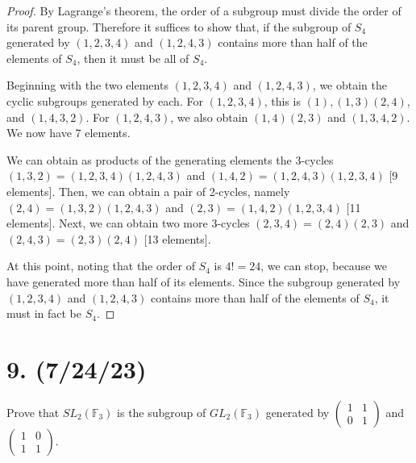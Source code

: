 \documentclass{article}
\begin{document}
\begin{proof}
    By Lagrange's theorem, the order of a subgroup must divide the order of its parent group. Therefore it suffices to show that, if the subgroup of $S_4$ generated by $(1, 2, 3, 4)$ and $(1, 2, 4, 3)$ contains more than half of the elements of $S_4$, then it must be all of $S_4$.

    Beginning with the two elements $(1, 2, 3, 4)$ and $(1, 2, 4, 3)$, we obtain the cyclic subgroups generated by each. For $(1, 2, 3, 4)$, this is $(1), (1, 3)(2, 4)$, and $(1, 4, 3, 2)$. For $(1, 2, 4, 3)$, we also obtain $(1, 4)(2, 3)$ and $(1, 3, 4, 2)$. We now have 7 elements.

    We can obtain as products of the generating elements the 3-cycles $(1, 3, 2) = (1, 2, 3, 4)(1, 2, 4, 3)$ and $(1, 4, 2) = (1, 2, 4, 3)(1, 2, 3, 4)$ [9 elements]. Then, we can obtain a pair of 2-cycles, namely $(2, 4) = (1, 3, 2)(1, 2, 4, 3)$ and $(2, 3) = (1, 4, 2)(1, 2, 3, 4)$ [11 elements]. Next, we can obtain two more 3-cycles $(2, 3, 4) = (2, 4)(2, 3)$ and $(2, 4, 3) = (2, 3)(2, 4)$ [13 elements].

    At this point, noting that the order of $S_4$ is $4! = 24$, we can stop, because we have generated more than half of its elements. Since the subgroup generated by $(1, 2, 3, 4)$ and $(1, 2, 4, 3)$ contains more than half of the elements of $S_4$, it must in fact be $S_4$.
\end{proof}

\section*{9. (7/24/23)}

Prove that $SL_2(\mathbb{F}_3)$ is the subgroup of $GL_2(\mathbb{F}_3)$ generated by $\begin{pmatrix}1 & 1 \\ 0 & 1\end{pmatrix}$ and $\begin{pmatrix}1 & 0 \\ 1 & 1\end{pmatrix}$.
\end{document}
